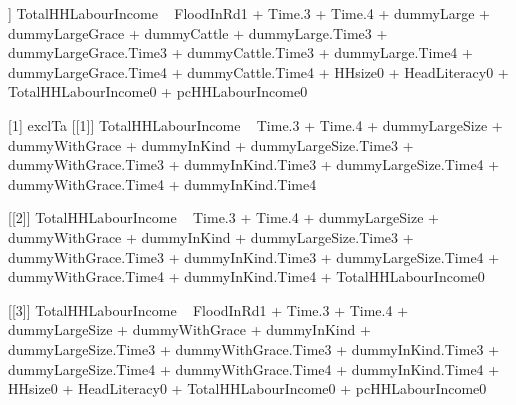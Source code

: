 \begin{Schunk}
\begin{Soutput}
[[3]]
TotalHHLabourIncome ~ FloodInRd1 + Time.3 + Time.4 + dummyLarge + 
    dummyLargeGrace + dummyCattle + dummyLarge.Time3 + dummyLargeGrace.Time3 + 
    dummyCattle.Time3 + dummyLarge.Time4 + dummyLargeGrace.Time4 + 
    dummyCattle.Time4 + HHsize0 + HeadLiteracy0 + TotalHHLabourIncome0 + 
    pcHHLabourIncome0

[1] exclTa
[[1]]
TotalHHLabourIncome ~ Time.3 + Time.4 + dummyLargeSize + dummyWithGrace + 
    dummyInKind + dummyLargeSize.Time3 + dummyWithGrace.Time3 + 
    dummyInKind.Time3 + dummyLargeSize.Time4 + dummyWithGrace.Time4 + 
    dummyInKind.Time4

[[2]]
TotalHHLabourIncome ~ Time.3 + Time.4 + dummyLargeSize + dummyWithGrace + 
    dummyInKind + dummyLargeSize.Time3 + dummyWithGrace.Time3 + 
    dummyInKind.Time3 + dummyLargeSize.Time4 + dummyWithGrace.Time4 + 
    dummyInKind.Time4 + TotalHHLabourIncome0

[[3]]
TotalHHLabourIncome ~ FloodInRd1 + Time.3 + Time.4 + dummyLargeSize + 
    dummyWithGrace + dummyInKind + dummyLargeSize.Time3 + dummyWithGrace.Time3 + 
    dummyInKind.Time3 + dummyLargeSize.Time4 + dummyWithGrace.Time4 + 
    dummyInKind.Time4 + HHsize0 + HeadLiteracy0 + TotalHHLabourIncome0 + 
    pcHHLabourIncome0
\end{Soutput}
\end{Schunk}


